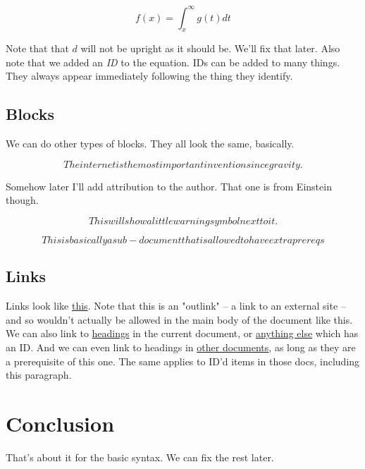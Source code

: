 \documentclass[12pt]{article}
\begin{document}
 \label{eqn:f-defn}\[f(x) = \int_x^\infty g(t) dt
\]

Note that that $d$ will not be upright as it should be.  We'll fix that later.  Also note that we added an \emph{ID} to the equation.  IDs can be added to many things.  They always appear immediately following the thing they identify.

 \subsection{Blocks}


We can do other types of blocks.  They all look the same, basically.


\[The internet is the most important invention since gravity.
\]

Somehow later I'll add attribution to the author.  That one is from Einstein though.


\[This will show a little warning symbol next to it.
\]


\[This is basically a sub-document that is allowed to have extra prereqs
\]

 \subsection{Links}


Links look like \href{https://learn.independentlearning.science/https://www.google.com}{this}.  Note that this is an "outlink" -- a link to an external site -- and so wouldn't actually be allowed in the main body of the document like this.  We can also link to \href{Blocks}{headings} in the current document, or \href{eqn:f-defn}{anything else} which has an ID.  And we can even link to headings in \href{/Physics/Classical/Mechanics/Newtonian#Second Law}{other documents}, as long as they are a prerequisite of this one.  The same applies to ID'd items in those docs, including this paragraph.

 \section{Conclusion}


That's about it for the basic syntax.  We can fix the rest later. 
\end{document}
